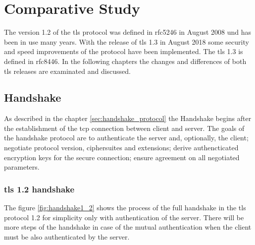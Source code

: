 \chapter{Comparative Study}
\label{chap:comparative_study}

The version 1.2 of the \gls{tls} protocol was defined in \gls{rfc}5246 in August 2008 und has been in use many years. With the release of \gls{tls} 1.3 in August 2018 some security and speed improvements of the protocol have been implemented. The \gls{tls} 1.3 is defined in \gls{rfc}8446. In the following chapters the changes and differences of both \gls{tls} releases are examinated and discussed.

\section{Handshake}
\label{sec:comparison_handshake}

As described in the chapter \ref{sec:handshake_protocol} the Handshake begins after the establishment of the \gls{tcp} connection between client and server. The goals of the handshake protocol are to authenticate the server and, optionally, the client; negotiate protocol version, ciphersuites and extensions; derive authencticated encryption keys for the secure connection; ensure agreement on all negotiated parameters. \cite{Hassenstein}

\subsection{\gls{tls} 1.2 handshake}
\label{subsec:handshake1_2}

The figure \ref{fig:handshake1_2} shows the process of the full handshake in the \gls{tls} protocol 1.2 for simplicity only with authentication of the server. There will be more steps of the handshake in case of the mutual authentication when the client must be also authenticated by the server.


